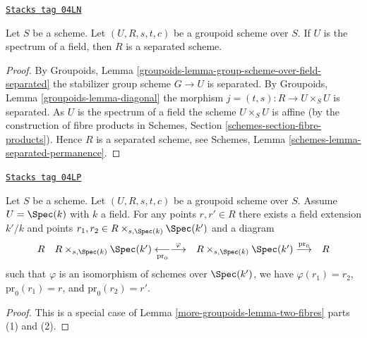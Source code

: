 \begin{lemma}
\label{more-groupoids-lemma-groupoid-on-field-separated}
\href{https://stacks.math.columbia.edu/tag/04LN}{\texttt{Stacks tag 04LN}}

Let $S$ be a scheme. Let $(U, R, s, t, c)$ be a groupoid scheme
over $S$. If $U$ is the spectrum of a field,
then $R$ is a separated scheme.
\end{lemma}

\begin{proof}
By
Groupoids, Lemma \ref{groupoids-lemma-group-scheme-over-field-separated}
the stabilizer group scheme $G \to U$ is separated. By
Groupoids, Lemma \ref{groupoids-lemma-diagonal}
the morphism $j = (t, s) : R \to U \times_S U$ is separated.
As $U$ is the spectrum of a field the scheme
$U \times_S U$ is affine (by the construction of fibre products in
Schemes, Section \ref{schemes-section-fibre-products}).
Hence $R$ is a separated scheme, see
Schemes, Lemma \ref{schemes-lemma-separated-permanence}.
\end{proof}

\begin{lemma}
\label{more-groupoids-lemma-groupoid-on-field-homogeneous}
\href{https://stacks.math.columbia.edu/tag/04LP}{\texttt{Stacks tag 04LP}}

Let $S$ be a scheme. Let $(U, R, s, t, c)$ be a groupoid scheme
over $S$. Assume $U = \Spec(k)$ with $k$ a field.
For any points $r, r' \in R$ there exists a field extension
$k'/k$ and points
$r_1, r_2 \in R \times_{s, \Spec(k)} \Spec(k')$
and a diagram
$$
\begin{array}{cccc}R & R \times_{s, \Spec(k)} \Spec(k')
\underset{\text{pr}_0}{\longleftarrow}\overset{\varphi}{\longrightarrow} & R \times_{s, \Spec(k)} \Spec(k')
\overset{\text{pr}_0}{\longrightarrow} & R\end{array}
$$
such that $\varphi$ is an isomorphism of schemes over $\Spec(k')$,
we have $\varphi(r_1) = r_2$, $\text{pr}_0(r_1) = r$, and
$\text{pr}_0(r_2) = r'$.
\end{lemma}

\begin{proof}
This is a special case of
Lemma \ref{more-groupoids-lemma-two-fibres}
parts (1) and (2).
\end{proof}

